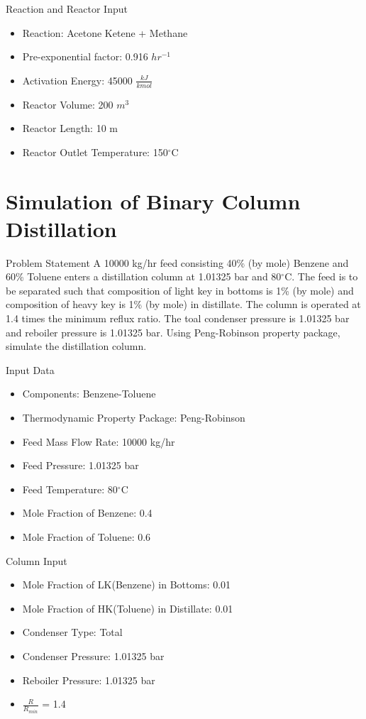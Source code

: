 \documentclass[10pt]{beamer}
\begin{document}
\begin{frame}{Reaction and Reactor Input}
	\begin{itemize}
		\item Reaction: Acetone \rightarrow Ketene + Methane
		\item Pre-exponential factor: 0.916 $hr^{-1}$
		\item Activation Energy: 45000 $\frac{kJ}{kmol}$
		\item Reactor Volume: 200 $m^3$
		\item Reactor Length: 10 m
		\item Reactor Outlet Temperature: 150$^\circ$C
	\end{itemize}
\end{frame}

\section{Simulation of Binary Column Distillation}
\begin{frame}{Problem Statement}
	A 10000 kg/hr feed consisting 40\% (by mole) Benzene and 60\% Toluene enters a distillation column at 1.01325 bar and 80$^\circ$C. The feed is to be separated such that composition of light key in bottoms is 1\% (by mole) and composition of heavy key is 1\% (by mole) in distillate. The
	column is operated at 1.4 times the minimum reflux ratio. The toal condenser pressure is 1.01325 bar and reboiler
	pressure is 1.01325 bar. Using Peng-Robinson property package, simulate the distillation column.
\end{frame}

\begin{frame}{Input Data}
	\begin{itemize}
		\item Components: Benzene-Toluene
		\item Thermodynamic Property Package: Peng-Robinson
		\item Feed Mass Flow Rate: 10000 kg/hr
		\item Feed Pressure: 1.01325 bar
		\item Feed Temperature: 80$^\circ$C
		\item Mole Fraction of Benzene: 0.4
		\item Mole Fraction of Toluene: 0.6
	\end{itemize}
\end{frame}

\begin{frame}{Column Input}
	\begin{itemize}
		\item Mole Fraction of LK(Benzene) in Bottoms: 0.01
		\item Mole Fraction of HK(Toluene) in Distillate: 0.01
		\item Condenser Type: Total
		\item Condenser Pressure: 1.01325 bar
		\item Reboiler Pressure: 1.01325 bar
		\item $\frac{R}{R_{min}}$ = 1.4
	\end{itemize}
\end{frame}
\end{document}
